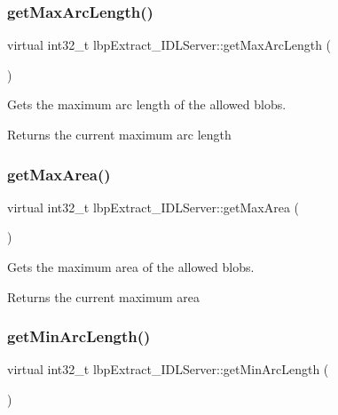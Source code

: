 \subsubsection{\texorpdfstring{getMaxArcLength()}{getMaxArcLength()}}
{\footnotesize\ttfamily virtual int32\+\_\+t lbp\+Extract\+\_\+\+I\+D\+L\+Server\+::get\+Max\+Arc\+Length (\begin{DoxyParamCaption}{ }\end{DoxyParamCaption})\hspace{0.3cm}{\ttfamily [virtual]}}



Gets the maximum arc length of the allowed blobs. 

\begin{DoxyReturn}{Returns}
the current maximum arc length 
\end{DoxyReturn}
\mbox{\label{classlbpExtract__IDLServer_a46c4f38052cd2abd334e4e0f0263fab4}} 
\subsubsection{\texorpdfstring{getMaxArea()}{getMaxArea()}}
{\footnotesize\ttfamily virtual int32\+\_\+t lbp\+Extract\+\_\+\+I\+D\+L\+Server\+::get\+Max\+Area (\begin{DoxyParamCaption}{ }\end{DoxyParamCaption})\hspace{0.3cm}{\ttfamily [virtual]}}



Gets the maximum area of the allowed blobs. 

\begin{DoxyReturn}{Returns}
the current maximum area 
\end{DoxyReturn}
\mbox{\label{classlbpExtract__IDLServer_ae98976e14296fd7fd3596da8faf862d3}} 
\subsubsection{\texorpdfstring{getMinArcLength()}{getMinArcLength()}}
{\footnotesize\ttfamily virtual int32\+\_\+t lbp\+Extract\+\_\+\+I\+D\+L\+Server\+::get\+Min\+Arc\+Length (\begin{DoxyParamCaption}{ }\end{DoxyParamCaption})\hspace{0.3cm}{\ttfamily [virtual]}}



